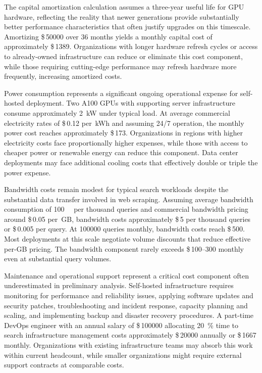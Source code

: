 The capital amortization calculation assumes a three-year useful life for GPU hardware, reflecting the reality that newer generations provide substantially better performance characteristics that often justify upgrades on this timescale. Amortizing \$\,\num{50000} over \num{36} months yields a monthly capital cost of approximately \$\,\num{1389}. Organizations with longer hardware refresh cycles or access to already-owned infrastructure can reduce or eliminate this cost component, while those requiring cutting-edge performance may refresh hardware more frequently, increasing amortized costs.

Power consumption represents a significant ongoing operational expense for self-hosted deployment. Two A100 GPUs with supporting server infrastructure consume approximately \SI{2}{\kilo\watt} under typical load. At average commercial electricity rates of \$\,\num{0.12} per~kWh and assuming 24/7 operation, the monthly power cost reaches approximately \$\,\num{173}. Organizations in regions with higher electricity costs face proportionally higher expenses, while those with access to cheaper power or renewable energy can reduce this component. Data center deployments may face additional cooling costs that effectively double or triple the power expense.

Bandwidth costs remain modest for typical search workloads despite the substantial data transfer involved in web scraping. Assuming average bandwidth consumption of \SI{100}{\giga\byte} per thousand queries and commercial bandwidth pricing around \$\,\num{0.05} per~GB, bandwidth costs approximately \$\,\num{5} per thousand queries or \$\,\num{0.005} per query. At \num{100000} queries monthly, bandwidth costs reach \$\,\num{500}. Most deployments at this scale negotiate volume discounts that reduce effective per-GB pricing. The bandwidth component rarely exceeds \$\,\numrange{100}{300} monthly even at substantial query volumes.


Maintenance and operational support represent a critical cost component often underestimated in preliminary analysis. Self-hosted infrastructure requires monitoring for performance and reliability issues, applying software updates and security patches, troubleshooting and incident response, capacity planning and scaling, and implementing backup and disaster recovery procedures. A part-time DevOps engineer with an annual salary of \$\,\num{100000} allocating \SI{20}{\percent} time to search infrastructure management costs approximately \$\,\num{20000} annually or \$\,\num{1667} monthly. Organizations with existing infrastructure teams may absorb this work within current headcount, while smaller organizations might require external support contracts at comparable costs.

